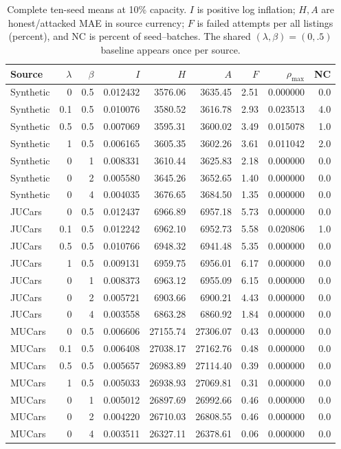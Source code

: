 \begin{table}[htbp]\centering\small
\setlength{\tabcolsep}{4pt}
\caption{Complete ten-seed means at 10\% capacity. $I$ is positive log inflation;
$H,A$ are honest/attacked MAE in source currency; $F$ is failed attempts per
all listings (percent), and NC is percent of seed--batches. The shared
$(\lambda,\beta)=(0,.5)$ baseline appears once per source.}
\label{tab:gap_all}
\begin{tabular}{lrrrrrrrr}\toprule
Source & $\lambda$ & $\beta$ & $I$ & $H$ & $A$ & $F$ & $\rho_{\max}$ & NC\\\midrule
Synthetic & 0 & 0.5 & 0.012432 & 3576.06 & 3635.45 & 2.51 & 0.000000 & 0.0\\
Synthetic & 0.1 & 0.5 & 0.010076 & 3580.52 & 3616.78 & 2.93 & 0.023513 & 4.0\\
Synthetic & 0.5 & 0.5 & 0.007069 & 3595.31 & 3600.02 & 3.49 & 0.015078 & 1.0\\
Synthetic & 1 & 0.5 & 0.006165 & 3605.35 & 3602.26 & 3.61 & 0.011042 & 2.0\\
Synthetic & 0 & 1 & 0.008331 & 3610.44 & 3625.83 & 2.18 & 0.000000 & 0.0\\
Synthetic & 0 & 2 & 0.005580 & 3645.26 & 3652.65 & 1.40 & 0.000000 & 0.0\\
Synthetic & 0 & 4 & 0.004035 & 3676.65 & 3684.50 & 1.35 & 0.000000 & 0.0\\
\midrule
JUCars & 0 & 0.5 & 0.012437 & 6966.89 & 6957.18 & 5.73 & 0.000000 & 0.0\\
JUCars & 0.1 & 0.5 & 0.012242 & 6962.10 & 6952.73 & 5.58 & 0.020806 & 1.0\\
JUCars & 0.5 & 0.5 & 0.010766 & 6948.32 & 6941.48 & 5.35 & 0.000000 & 0.0\\
JUCars & 1 & 0.5 & 0.009131 & 6959.75 & 6956.01 & 6.17 & 0.000000 & 0.0\\
JUCars & 0 & 1 & 0.008373 & 6963.12 & 6955.09 & 6.15 & 0.000000 & 0.0\\
JUCars & 0 & 2 & 0.005721 & 6903.66 & 6900.21 & 4.43 & 0.000000 & 0.0\\
JUCars & 0 & 4 & 0.003558 & 6863.28 & 6860.92 & 1.84 & 0.000000 & 0.0\\
\midrule
MUCars & 0 & 0.5 & 0.006606 & 27155.74 & 27306.07 & 0.43 & 0.000000 & 0.0\\
MUCars & 0.1 & 0.5 & 0.006408 & 27038.17 & 27162.76 & 0.48 & 0.000000 & 0.0\\
MUCars & 0.5 & 0.5 & 0.005657 & 26983.89 & 27114.40 & 0.39 & 0.000000 & 0.0\\
MUCars & 1 & 0.5 & 0.005033 & 26938.93 & 27069.81 & 0.31 & 0.000000 & 0.0\\
MUCars & 0 & 1 & 0.005012 & 26897.69 & 26992.66 & 0.46 & 0.000000 & 0.0\\
MUCars & 0 & 2 & 0.004220 & 26710.03 & 26808.55 & 0.46 & 0.000000 & 0.0\\
MUCars & 0 & 4 & 0.003511 & 26327.11 & 26378.61 & 0.06 & 0.000000 & 0.0\\
\bottomrule\end{tabular}\end{table}
